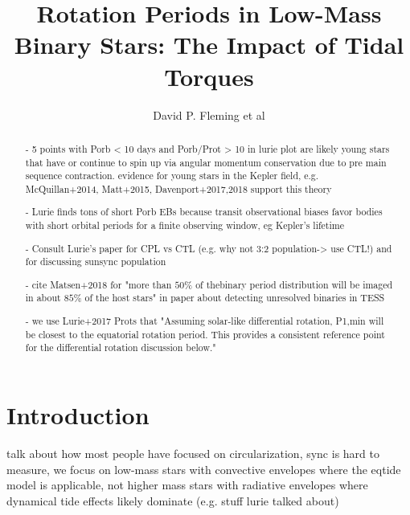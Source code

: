 \documentclass[twocolumn]{aastex61}
\begin{document}
\title{Rotation Periods in Low-Mass Binary Stars: The Impact of Tidal Torques}



\author{David P. Fleming et al}


\begin{abstract}

- 5 points with Porb < 10 days and Porb/Prot > 10 in lurie plot are likely young stars that have or continue to spin up via angular momentum conservation due to pre main sequence contraction.  evidence for young stars in the Kepler field, e.g. McQuillan+2014, Matt+2015, Davenport+2017,2018 support this theory

- Lurie finds tons of short Porb EBs because transit observational biases favor bodies with short orbital periods for a finite observing window, eg Kepler's lifetime 

- Consult Lurie's paper for CPL vs CTL (e.g. why not 3:2 population-> use CTL!) and for discussing sunsync population

- cite Matsen+2018 for "more than $50\%$ of thebinary period distribution will be imaged in about $85\%$ of the host stars" in paper
about detecting unresolved binaries in TESS

- we use Lurie+2017 Prots that "Assuming solar-like differential rotation, P1,min will be closest to the equatorial rotation period. This provides a consistent reference point for the differential rotation discussion below."

\end{abstract}




\section{Introduction} \label{sec:intro}

talk about how most people have focused on circularization, sync is hard to measure, we focus on low-mass stars with convective envelopes where the eqtide model is applicable, not higher mass stars with radiative envelopes where dynamical tide effects likely dominate (e.g. stuff lurie talked about)
\end{document}
